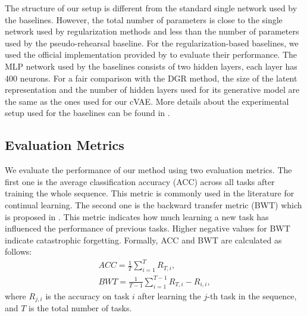 \documentclass[letterpaper]{article} %
\begin{document}
The structure of our setup is different from the standard single network used by the baselines. However, the total number of parameters is close to the single network used by regularization methods and less than the number of parameters used by the pseudo-rehearsal baseline. For the regularization-based baselines, we used the official implementation provided by \cite{VanDeVen2018a} to evaluate their performance. The MLP network used by the baselines consists of two hidden layers, each layer has 400 neurons. For a fair comparison with the DGR method, the size of the latent representation and the number of hidden layers used for its generative model are the same as the ones used for our cVAE. More details about the experimental setup used for the baselines can be found in \cite{VanDeVen2018a}.

\subsection{Evaluation Metrics}
We evaluate the performance of our method using two evaluation metrics. The first one is the average classification accuracy (ACC) across all tasks after training the whole sequence. This metric is commonly used in the literature for continual learning. The second one is the backward transfer metric (BWT) which is proposed in \cite{lopez2017gradient}. This metric indicates how much learning a new task has influenced the performance of previous tasks. Higher negative values for BWT indicate catastrophic forgetting. Formally, ACC and BWT are calculated as follows:
\begin{equation}
\label{ACC_BWT}
\begin{split}
ACC = \frac{1}{T} \sum_{i=1}^{T} R_{T,i}, \\
BWT = \frac{1}{T-1} \sum_{i=1}^{T-1} R_{T,i} - R_{i,i},
\end{split}
\end{equation}
where $R_{j,i}$ is the accuracy on task ${i}$ after learning
the $j$-th task in the sequence, and $T$ is the total number of tasks.
\end{document}
